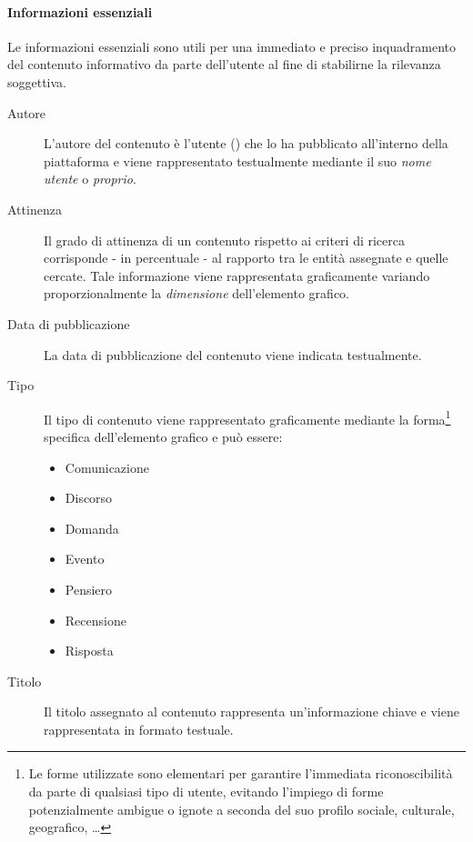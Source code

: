 \documentclass[10pt,a4paper,headinclude,footinclude,hidelinks]{scrreprt} %
\begin{document}
	\paragraph{Informazioni essenziali} Le informazioni essenziali sono utili per una immediato e preciso inquadramento del contenuto informativo da parte dell'utente al fine di stabilirne la rilevanza soggettiva.
	\begin{description}
	\item[Autore] L'autore del contenuto è l'utente (\textit{}) che lo ha pubblicato all'interno della piattaforma e viene rappresentato testualmente mediante il suo \textit{nome utente} o \textit{proprio}.
	\item[Attinenza] Il grado di attinenza di un contenuto rispetto ai criteri di ricerca corrisponde - in percentuale - al rapporto tra le entità assegnate e quelle cercate. Tale informazione viene rappresentata graficamente variando proporzionalmente la \textit{dimensione} dell'elemento grafico.
	\item[Data di pubblicazione] La data di pubblicazione del contenuto viene indicata testualmente.
	\item[Tipo] Il tipo di contenuto viene rappresentato graficamente mediante la forma\footnote{Le forme utilizzate sono elementari per garantire l'immediata riconoscibilità da parte di qualsiasi tipo di utente, evitando l'impiego di forme potenzialmente ambigue o ignote a seconda del suo profilo sociale, culturale, geografico, \ldots} specifica dell'elemento grafico e può essere:
	\begin{itemize}
	\item Comunicazione
	\item Discorso
	\item Domanda
	\item Evento
	\item Pensiero
	\item Recensione
	\item Risposta
	\end{itemize}	 
	\item[Titolo] Il titolo assegnato al contenuto rappresenta un'informazione chiave e viene rappresentata in formato testuale.
	\end{description}
\end{document}
